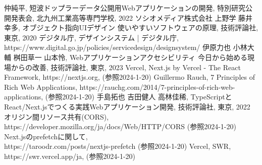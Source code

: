 \begin{thebibliography}{99}
	仲純平, 短波ドップラーデータ公開用Webアプリケーションの開発, 特別研究公開発表会, 北九州工業高等専門学校, 2022
	ソシオメディア株式会社 上野学 藤井幸多, オブジェクト指向UIデザイン 使いやすいソフトウェアの原理, 技術評論社, 東京, 2020
	デジタル庁, デザインシステム | デジタル庁, https://www.digital.go.jp/policies/servicedesign/designsystem/
	伊原力也 小林大輔 桝田草一 山本怜, Webアプリケーションアクセシビリティ 今日から始める現場からの改善, 技術評論社, 東京, 2023
	Vercel, Next.js by Vercel - The React Framework, https://nextjs.org, (参照2024-1-20)
	Guillermo Rauch, 7 Principles of Rich Web Applications, https://rauchg.com/2014/7-principles-of-rich-web-applications, (参照2024-1-20)
	手島拓也 吉田健人 高林佳稀, TypeScriptとReact/Next.jsでつくる実践Webアプリケーション開発, 技術評論社, 東京, 2022
	オリジン間リソース共有(CORS),\\ https://developer.mozilla.org/ja/docs/Web/HTTP/CORS (参照2024-1-20)
	Next.jsのprefetchに関して,\\ https://taroodr.com/posts/nextjs-prefetch (参照2024-1-20)
	Vercel, SWR, https://swr.vercel.app/ja, (参照2024-1-20)
\end{thebibliography}